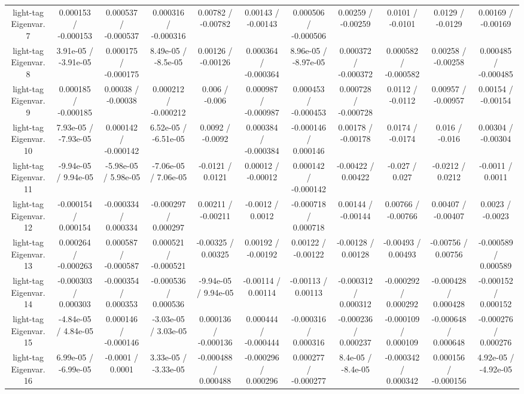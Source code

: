\begin{table}[htbp]
\begin{center}
\begin{tabular}{|c|c|c|c|c|c|c|c|c|c|c|}
  light-tag Eigenvar. 7 & 0.000153 / -0.000153 & 0.000537 / -0.000537 & 0.000316 / -0.000316 & 0.00782 / -0.00782 & 0.00143 / -0.00143 & 0.000506 / -0.000506 & 0.00259 / -0.00259 & 0.0101 / -0.0101 & 0.0129 / -0.0129 & 0.00169 / -0.00169 \\ 
  light-tag Eigenvar. 8 & 3.91e-05 / -3.91e-05 & 0.000175 / -0.000175 & 8.49e-05 / -8.5e-05 & 0.00126 / -0.00126 & 0.000364 / -0.000364 & 8.96e-05 / -8.97e-05 & 0.000372 / -0.000372 & 0.000582 / -0.000582 & 0.00258 / -0.00258 & 0.000485 / -0.000485 \\ 
  light-tag Eigenvar. 9 & 0.000185 / -0.000185 & 0.00038 / -0.00038 & 0.000212 / -0.000212 & 0.006 / -0.006 & 0.000987 / -0.000987 & 0.000453 / -0.000453 & 0.000728 / -0.000728 & 0.0112 / -0.0112 & 0.00957 / -0.00957 & 0.00154 / -0.00154 \\ 
  light-tag Eigenvar. 10 & 7.93e-05 / -7.93e-05 & 0.000142 / -0.000142 & 6.52e-05 / -6.51e-05 & 0.0092 / -0.0092 & 0.000384 / -0.000384 & -0.000146 / 0.000146 & 0.00178 / -0.00178 & 0.0174 / -0.0174 & 0.016 / -0.016 & 0.00304 / -0.00304 \\ 
  light-tag Eigenvar. 11 & -9.94e-05 / 9.94e-05 & -5.98e-05 / 5.98e-05 & -7.06e-05 / 7.06e-05 & -0.0121 / 0.0121 & 0.00012 / -0.00012 & 0.000142 / -0.000142 & -0.00422 / 0.00422 & -0.027 / 0.027 & -0.0212 / 0.0212 & -0.0011 / 0.0011 \\ 
  light-tag Eigenvar. 12 & -0.000154 / 0.000154 & -0.000334 / 0.000334 & -0.000297 / 0.000297 & 0.00211 / -0.00211 & -0.0012 / 0.0012 & -0.000718 / 0.000718 & 0.00144 / -0.00144 & 0.00766 / -0.00766 & 0.00407 / -0.00407 & 0.0023 / -0.0023 \\ 
  light-tag Eigenvar. 13 & 0.000264 / -0.000263 & 0.000587 / -0.000587 & 0.000521 / -0.000521 & -0.00325 / 0.00325 & 0.00192 / -0.00192 & 0.00122 / -0.00122 & -0.00128 / 0.00128 & -0.00493 / 0.00493 & -0.00756 / 0.00756 & -0.000589 / 0.000589 \\ 
  light-tag Eigenvar. 14 & -0.000303 / 0.000303 & -0.000354 / 0.000353 & -0.000536 / 0.000536 & -9.94e-05 / 9.94e-05 & -0.00114 / 0.00114 & -0.00113 / 0.00113 & -0.000312 / 0.000312 & -0.000292 / 0.000292 & -0.000428 / 0.000428 & -0.000152 / 0.000152 \\ 
  light-tag Eigenvar. 15 & -4.84e-05 / 4.84e-05 & 0.000146 / -0.000146 & -3.03e-05 / 3.03e-05 & 0.000136 / -0.000136 & 0.000444 / -0.000444 & -0.000316 / 0.000316 & -0.000236 / 0.000237 & -0.000109 / 0.000109 & -0.000648 / 0.000648 & -0.000276 / 0.000276 \\ 
  light-tag Eigenvar. 16 & 6.99e-05 / -6.99e-05 & -0.0001 / 0.0001 & 3.33e-05 / -3.33e-05 & -0.000488 / 0.000488 & -0.000296 / 0.000296 & 0.000277 / -0.000277 & 8.4e-05 / -8.4e-05 & -0.000342 / 0.000342 & 0.000156 / -0.000156 & 4.92e-05 / -4.92e-05 \\ 

\end{tabular}
\end{center}
\end{table}
